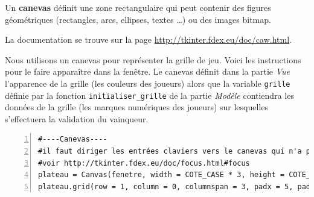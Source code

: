 \documentclass[a4paper, french, 12pt]{article}  %
\newcounter{rque}
\begin{document}
Un \textbf{canevas}  définit une zone rectangulaire qui peut contenir des figures géométriques (rectangles, arcs, ellipses, textes \ldots) ou des images bitmap. 

La documentation se trouve sur la page \url{http://tkinter.fdex.eu/doc/caw.html}.

Nous utilisons un canevas  pour représenter la grille de jeu. Voici les instructions pour le faire apparaître dans la fenêtre. Le canevas définit dans la partie \textit{Vue} l'apparence de la grille (les couleurs des joueurs) alors que la variable \texttt{grille} définie par la fonction \texttt{initialiser\_grille} de la partie \textit{Modèle} contiendra les données de la grille (les marques numériques des joueurs) sur lesquelles s'effectuera la  validation du vainqueur.

\begin{lstlisting}[numbers=left]
#----Canevas----
#il faut diriger les entrées claviers vers le canevas qui n'a pas le focus par défaut
#voir http://tkinter.fdex.eu/doc/focus.html#focus
plateau = Canvas(fenetre, width = COTE_CASE * 3, height = COTE_CASE * 3, bg = 'white', takefocus = 1)
plateau.grid(row = 1, column = 0, columnspan = 3, padx = 5, pady = 5)
\end{lstlisting}
\end{document}
